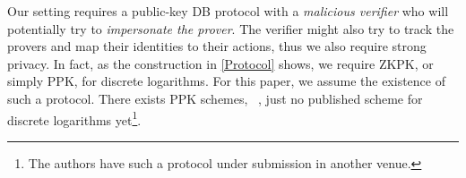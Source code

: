 Our setting requires a public-key \ac{DB} protocol with a \emph{malicious verifier} who will potentially try to \emph{impersonate the prover}.
The verifier might also try to track the provers and map their identities to 
their actions, thus we also require strong privacy.
In fact, as the construction in \cref{Protocol} shows, we require  
\ac{ZKPK}, or simply \ac{PPK}, for discrete logarithms.
For this paper, we assume the existence of such a protocol.
There exists \ac{PPK} schemes, \eg~\cite{ProProx}, just no published scheme for 
discrete logarithms yet\footnote{%
  The authors have such a protocol under submission in another venue.
}.


